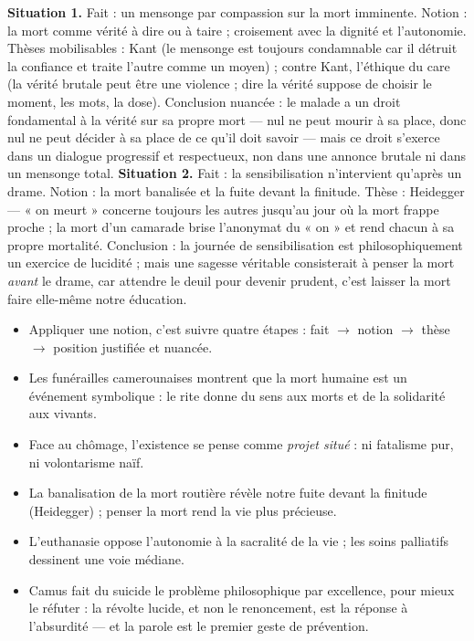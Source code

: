 \documentclass[11pt]{article}
\newcommand{\cle}[1]{{\popxbold\color{popdark}#1}}
\begin{document}
\begin{corrige}
\textbf{Situation 1.} Fait : un mensonge par compassion sur la mort imminente. Notion : la mort comme vérité à dire ou à taire ; croisement avec la dignité et l'autonomie. Thèses mobilisables : Kant (le mensonge est toujours condamnable car il détruit la confiance et traite l'autre comme un moyen) ; contre Kant, l'éthique du care (la vérité brutale peut être une violence ; dire la vérité suppose de choisir le moment, les mots, la dose). Conclusion nuancée : le malade a un droit fondamental à la vérité sur sa propre mort — nul ne peut mourir à sa place, donc nul ne peut décider à sa place de ce qu'il doit savoir — mais ce droit s'exerce dans un dialogue progressif et respectueux, non dans une annonce brutale ni dans un mensonge total.
\textbf{Situation 2.} Fait : la sensibilisation n'intervient qu'après un drame. Notion : la mort banalisée et la fuite devant la finitude. Thèse : Heidegger — « on meurt » concerne toujours les autres jusqu'au jour où la mort frappe proche ; la mort d'un camarade brise l'anonymat du « on » et rend chacun à sa propre mortalité. Conclusion : la journée de sensibilisation est philosophiquement un exercice de lucidité ; mais une sagesse véritable consisterait à penser la mort \emph{avant} le drame, car attendre le deuil pour devenir prudent, c'est laisser la mort faire elle-même notre éducation.
\end{corrige}

\begin{aretenir}
\begin{itemize}
\item Appliquer une notion, c'est suivre quatre étapes : \cle{fait} $\rightarrow$ \cle{notion} $\rightarrow$ \cle{thèse} $\rightarrow$ \cle{position justifiée et nuancée}.
\item Les funérailles camerounaises montrent que la mort humaine est un événement symbolique : le rite donne du sens aux morts et de la solidarité aux vivants.
\item Face au chômage, l'existence se pense comme \emph{projet situé} : ni fatalisme pur, ni volontarisme naïf.
\item La banalisation de la mort routière révèle notre fuite devant la finitude (Heidegger) ; penser la mort rend la vie plus précieuse.
\item L'euthanasie oppose l'autonomie à la sacralité de la vie ; les soins palliatifs dessinent une voie médiane.
\item Camus fait du suicide le problème philosophique par excellence, pour mieux le réfuter : la révolte lucide, et non le renoncement, est la réponse à l'absurdité — et la parole est le premier geste de prévention.
\end{itemize}
\end{aretenir}
\end{document}
